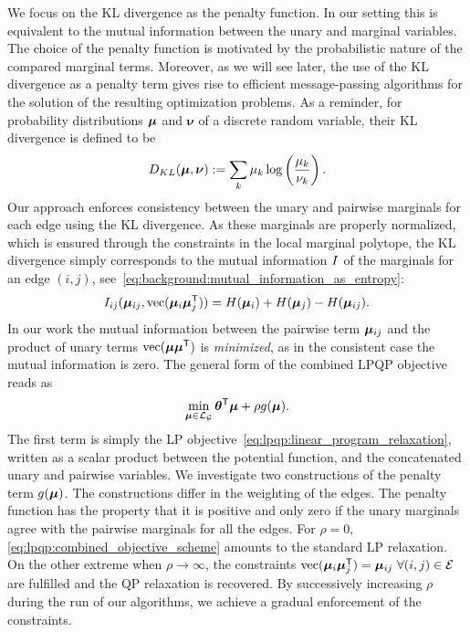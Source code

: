 We focus on the \acf{KL} divergence as the penalty function. In
our setting this is equivalent to the mutual information between the unary and
marginal variables. The choice of the penalty function is
motivated by the probabilistic nature of the compared marginal terms.
Moreover, as we will see later, the use of the \ac{KL} divergence as a penalty term
gives rise to efficient message-passing algorithms for the solution of the
resulting optimization problems.
As a reminder, for probability distributions
$\bm{\mu}$ and $\bm{\nu}$ of a discrete random variable, 
their \ac{KL} divergence is defined to be
\[
    D_{KL}(\bm{\mu}, \bm{\nu}) := \sum_{k} \mu_{k}
    \log\left(\frac{\mu_{k}}{\nu_{k}}\right).
\]
Our approach enforces consistency between the unary and pairwise marginals for
each edge using the \ac{KL} divergence. As these marginals are properly normalized,
which is ensured
through the constraints in the local marginal polytope, the \ac{KL} divergence
simply corresponds to the
mutual information $I$ of the marginals for an edge
$(i,j)$, see~\eqref{eq:background:mutual_information_as_entropy}:
\[
    I_{ij}(\bm{\mu}_{ij}, \mathrm{vec}(\bm{\mu}_i
    \bm{\mu}_j^{\mathsf{T}})) =
    H(\bm{\mu}_i) + H(\bm{\mu}_j) -
    H(\bm{\mu}_{ij}).
\]
In our work the mutual information between the pairwise term
$\bm{\mu}_{ij}$ and the product of unary terms
$\mathrm{vec}(\bm{\mu}\bm{\mu}^{\mathsf{T}})$ is
\emph{minimized}, as in the consistent case the mutual information is zero.
The general form of the combined \ac{LPQP} objective reads as 
\begin{equation}
    \min_{\bm{\mu}\in\mathcal{L}_{\mathcal{G}}} 
    \bm{\theta}^{\mathsf{T}} \bm{\mu} 
    + \rho g(\bm{\mu}).
    \label{eq:lpqp:combined_objective_scheme}
\end{equation}
The first term is simply the \ac{LP}
objective~\eqref{eq:lpqp:linear_program_relaxation}, written as a scalar product
between the potential function, and the concatenated unary and pairwise
variables. We investigate two constructions of the penalty term
$g(\bm{\mu})$. The constructions differ in
the weighting of the edges. The penalty function has the property that it is
positive and only zero if the unary marginals agree with the pairwise
marginals for all the edges.
For $\rho = 0$, \eqref{eq:lpqp:combined_objective_scheme}
amounts to the standard \ac{LP} relaxation. 
On the other extreme when $\rho \to \infty$, the constraints 
$\mathrm{vec}(\bm{\mu}_{i} \bm{\mu}_{j}^{\mathsf{T}}) =
\bm{\mu}_{ij} \ \forall (i,j) \in \mathcal{E}$ are fulfilled and the \ac{QP} relaxation is recovered.
By successively increasing $\rho$ during the run of our algorithms, we achieve
a gradual enforcement of the constraints. 

